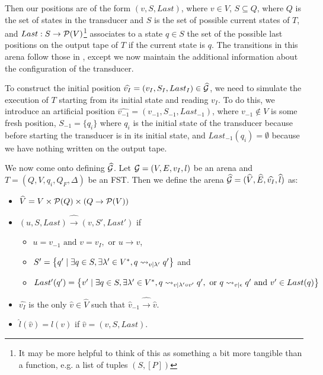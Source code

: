 \documentclass[10pt, a4paper]{report}
\begin{document}
Then our positions are of the form $(v, S, Last)$, where $v \in V$, $S \subseteq
Q$, where $Q$ is the set of states in the transducer and $S$ is the set of
possible current states of $T$, and $Last : S \rightarrow \mathcal{P}(V)$\footnote{It may be
  more helpful to think of this as something a bit more tangible than a
  function, e.g. a list of tuples $(S, [P])$} associates to a state $q \in S$
the set of the possible last positions on the output tape of $T$ if the current
state is $q$. The transitions in this arena follow those in , except we
now maintain the additional information about the configuration of the
transducer.

To construct the initial position $\widehat{v_I} = (v_I, S_I, Last_I) \in
\widehat{\mathcal{G}}$, we need to simulate the execution of $T$ starting from its
initial state and reading $v_I$. To do this, we introduce an artificial position
$\widehat{v_{-1}} = (v_{-1}, S_{-1}, Last_{-1})$, where $v_{-1} \not \in V$ is
some fresh position, $S_{-1} = \{q_i\}$ where $q_i$ is the initial state of the
transducer because before starting the transducer is in its initial state, and
$Last_{-1} (q_i) = \emptyset$ because we have nothing written on the output
tape.  

We now come onto defining $\widehat{\mathcal{G}}$. Let $\mathcal{G} = (V, E, v_I, l)$ be an arena and
$T = (Q, V, q_i, Q_F, \Delta)$ be an FST. Then we define the arena
$\widehat{\mathcal{G}} = (\widehat{V}, \widehat{E}, \widehat{v_I}, \widehat{l})$ as:

\begin{itemize}
\item $\widehat{V} = V \times \mathcal{P}(Q) \times (Q \rightarrow \mathcal{P}(V))$
\item $(u, S, Last) \widehat{\rightarrow} (v, S', Last')$ if
  \begin{itemize}
  \item $u = v_{-1} \text{ and } v = v_I, \text{ or } u \rightarrow v$,
  \item $S' = \left\{q' \mid \exists q \in S, \exists \lambda' \in V^\ast, q
      \rightsquigarrow_{v \mid \lambda'} q' \right\}$ and
  \item $Last' (q') = \left\{ v' \mid \exists q \in S, \exists \lambda' \in
      V^\ast, q \rightsquigarrow_{v \mid \lambda' \circ v'} q', \text{ or } q \rightsquigarrow_{v \mid
        \epsilon} q' \text{ and } v' \in Last(q) \right\}$
  \end{itemize}
\item $\widehat{v_I}$ is the only $\widehat{v} \in \widehat{V}$ such that
  $\widehat{v}_{-1} \widehat{\rightarrow} \widehat{v}$.
\item $\widehat{l}(\widehat{v}) = l (v)$ if $\widehat{v}= (v, S, Last)$. 
\end{itemize}
\end{document}
